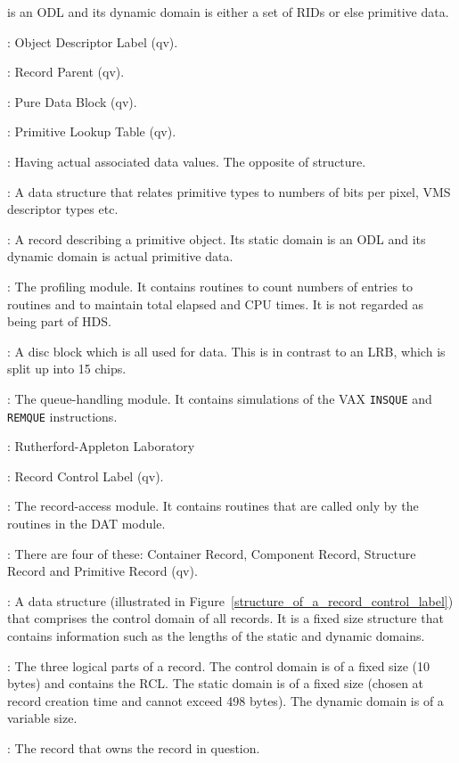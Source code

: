 \begin {description}
is an ODL and its dynamic domain is either a set of RIDs or else primitive data.
\item [ODL]: Object Descriptor Label (qv).
\item [Parent]: Record Parent (qv).
\item [PDB]: Pure Data Block (qv).
\item [PLT]: Primitive Lookup Table (qv).
\item [Primitive]: Having actual associated data values. The opposite of
structure.
\item [Primitive Lookup Table]: A data structure that relates primitive types
to numbers of bits per pixel, VMS descriptor types etc.
\item [Primitive Record]: A record describing a primitive object. Its static
domain is an ODL and its dynamic domain is actual primitive data.
\item [PRO]: The profiling module. It contains routines to count numbers
of entries to routines and to maintain total elapsed and CPU times. It is
not regarded as being part of HDS.
\item [Pure Data Block]: A disc block which is all used for data. This is
in contrast to an LRB, which is split up into 15 chips.
\item [QUE]: The queue-handling module. It contains simulations of the VAX
{\tt INSQUE} and {\tt REMQUE} instructions.
\item [RAL]: Rutherford-Appleton Laboratory
\item [RCL]: Record Control Label (qv).
\item [REC]: The record-access module. It contains routines that are called
only by the routines in the DAT module.
\item [Record Classes]: There are four of these: Container Record, Component
Record, Structure Record and Primitive Record (qv).
\item [Record Control Label]: A data structure (illustrated in
Figure~\ref{structure_of_a_record_control_label}) that comprises the control
domain of all records. It is a fixed size structure that contains information
such as the lengths of the static and dynamic domains.
\item [Record Domains]: The three logical parts of a record. The control
domain is of a fixed size (10 bytes) and contains the RCL. The static domain is
of a fixed size (chosen at record creation time and cannot exceed 498 bytes).
The dynamic domain is of a variable size.
\item [Record Parent]: The record that owns the record in question.

\end{description}

